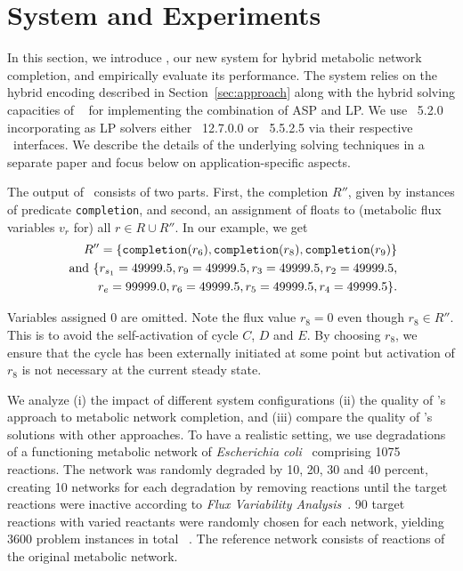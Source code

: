 \section{System and Experiments}\label{sec:experiments}
\label{sec:sysandexp}

In this section, we introduce \fluto, our new system for hybrid metabolic network completion, and empirically evaluate its performance.
The system relies on the hybrid encoding described in Section~\ref{sec:approach}
along with the hybrid solving capacities of \clingo~\citep{gekakaosscwa16a} for implementing the combination of ASP and LP.
We use \clingo~5.2.0 %
incorporating as LP solvers either \cplex~12.7.0.0 or \lpsolve~5.5.2.5 via their respective \python\ interfaces.
We describe the details of the underlying solving techniques in a separate paper and focus below on application-specific aspects.

The output of \fluto\ consists of two parts.
First, the completion $R''$, given by instances of predicate \texttt{completion}, and
second, an assignment of floats to (metabolic flux variables $v_r$ for) all $r\in R\cup R''$.
In our example, we get
\begin{align*}%
R''=\{\texttt{completion}(r_6), \texttt{completion}(r_8), \texttt{completion}(r_9)\}
\\
\text{ and } \{\SeedReaction=49999.5, r_9=49999.5, r_3=49999.5, r_2=49999.5, \\
 \ExportReaction=99999.0, r_6=49999.5, r_5=49999.5, r_4=49999.5\}.
\end{align*}%

Variables assigned $0$ are omitted.
Note the flux value $r_8=0$ even though $r_8\in R''$.
This is to avoid the self-activation of cycle $C$, $D$ and $E$.
By choosing $r_8$, we ensure that the cycle has been externally initiated at some point
but activation of $r_8$ is not necessary at the current steady state.

We analyze
(i)   the impact of different system configurations
(ii)  the quality of \fluto's approach to metabolic network completion, and
(iii) compare the quality of \fluto's solutions with other approaches.
To have a realistic setting,
we use degradations of a functioning metabolic network of \textit{Escherichia coli}~\citep{Reed2003} comprising 1075 reactions.
The network was randomly degraded by 10, 20, 30 and 40 percent,
creating 10 networks for each degradation
by removing reactions until the target reactions were inactive according to \emph{Flux Variability Analysis}~\citep{Becker2007}.
90 target reactions with varied reactants were randomly chosen for each network, yielding 3600 problem instances in total ~\citep{Prigent2017}.
The reference network consists of reactions of the original metabolic network.


